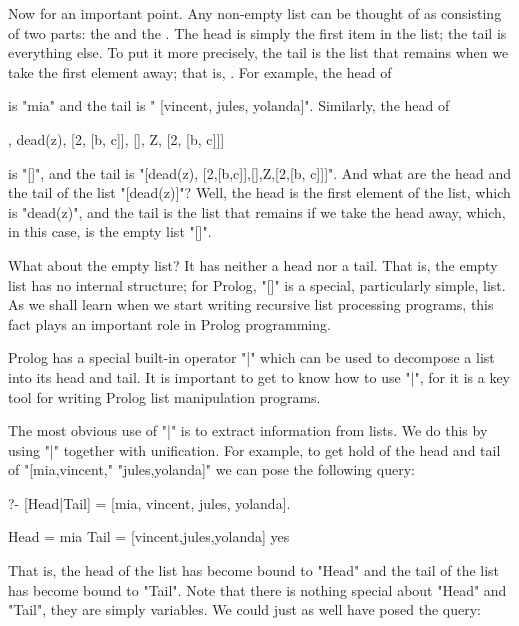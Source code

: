 Now for an important point.  Any non-empty list can be thought of as
consisting of two parts: the  and the .  The
head is simply the first item in the list; the tail is everything
else. To put it more precisely, the tail is the list
that remains when we take the first element away; that is,
. For example, the head
of

\begin{LPNcodedisplay}
\end{LPNcodedisplay}
is "mia" and the tail is " [vincent, jules, yolanda]".
Similarly, the head of
  \begin{LPNcodedisplay}
[[], dead(z), [2, [b, c]], [], Z, [2, [b, c]]]
\end{LPNcodedisplay}
is "[]", and the
tail is "[dead(z), [2,[b,c]],[],Z,[2,[b, c]]]".
And what are the head and the tail of the list "[dead(z)]"?
Well, the head is the first element of the list, which is
"dead(z)", and the tail is the list that remains if we take
the head away, which, in this case, is the empty list "[]".

What about the empty list? It has neither a head nor a tail.
That is, the empty list has no internal structure; for Prolog,
"[]" is a special, particularly simple, list.  As we shall
learn when we start writing recursive list processing programs, this
fact plays an important role in Prolog programming.

Prolog has a special built-in operator "|" which can be used to
decompose a list into its head and tail. It is important to get to
know how to use "|", for it is a key tool for writing Prolog list
manipulation programs.

The most obvious use of "|" is to extract information from lists.  We
do this by using "|" together with unification.  For example, to get
hold of the head and tail of "[mia,vincent," "jules,yolanda]" we can
pose the following query:

\begin{LPNcodedisplay}
?- [Head|Tail] = [mia, vincent, jules, yolanda].

Head = mia
Tail = [vincent,jules,yolanda]
yes
\end{LPNcodedisplay}
That is, the head of the list has become bound to "Head" and the
tail of the list has become bound to "Tail".  Note that there is
nothing special about "Head" and "Tail", they are simply
variables.  We could just as well have posed the query:



